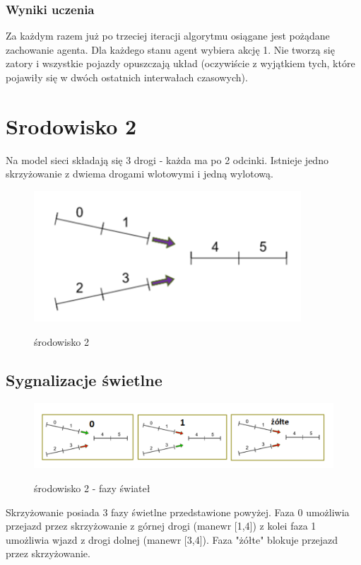 \documentclass[12pt]{book}
\theoremstyle{plain}
\begin{document}
\subsubsection{Wyniki uczenia}
Za każdym razem już po trzeciej iteracji algorytmu osiągane jest pożądane zachowanie agenta. Dla każdego stanu agent wybiera akcję 1. Nie tworzą się zatory i wszystkie pojazdy opuszczają układ (oczywiście z wyjątkiem tych, które pojawiły się w dwóch ostatnich interwałach czasowych).

\section{Srodowisko 2}
Na model sieci składają się 3 drogi - każda ma po 2 odcinki. Istnieje jedno skrzyżowanie z dwiema drogami wlotowymi i jedną wylotową.
	\begin{figure}[H]
	\centering
	\includegraphics[width=10cm]{images/env_14}
	\label{fig:env_14}
	\caption{środowisko 2}
\end{figure}

\subsection{Sygnalizacje świetlne}	
\begin{figure}[H]
	\centering
	\includegraphics[width=17cm]{images/env_14_fazy}
	\label{fig:env_14_fazy}
	\caption{środowisko 2 - fazy świateł}
\end{figure}\noindent
Skrzyżowanie posiada 3 fazy świetlne przedstawione powyżej. Faza 0 umożliwia przejazd przez skrzyżowanie z górnej drogi (manewr [1,4]) z kolei faza 1 umożliwia wjazd z drogi dolnej (manewr [3,4]). Faza "żółte" blokuje przejazd przez skrzyżowanie.
\end{document}
